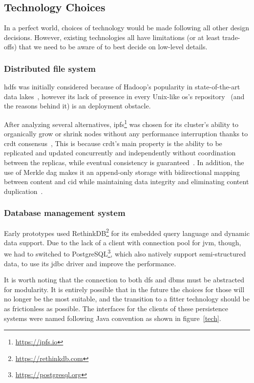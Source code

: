 \subsection{Technology Choices}
In a perfect world, choices of technology would be made following
all other design decisions.  However, existing technologies all have
limitations (or at least trade-offs) that we need to be aware of to best
decide on low-level details.

\subsubsection{Distributed file system}
\gls{hdfs} was initially considered because of Hadoop's popularity
in state-of-the-art data lakes~\cite{lake}, however its lack of presence
in every Unix-like \gls{os}'s repository~\cite{hdfs} (and the reasons behind it)
is an deployment obstacle.

After analyzing several alternatives, \gls{ipfs}\footnote{\url{https://ipfs.io}}
was chosen for its cluster's ability to organically grow or shrink nodes
without any performance interruption thanks to \gls{crdt} consensus~\cite{pin},
This is because \gls{crdt}'s main property is the ability to be replicated
and updated concurrently and independently without coordination between
the replicas, while eventual consistency is guaranteed~\cite{crdt}.
In addition, the use of Merkle \gls{dag} makes it an append-only storage
with bidirectional mapping between content and \gls{cid} while maintaining
data integrity and eliminating content duplication~\cite{ipfs}.

\subsubsection{Database management system}
Early prototypes used RethinkDB\footnote{\url{https://rethinkdb.com}}
for its embedded query language and dynamic data support.  Due to the lack
of a client with connection pool for \gls{jvm}, though, we had to switched to
PostgreSQL\footnote{\url{https://postgresql.org}}, which also natively support
semi-structured data, to use its \gls{jdbc} driver and improve the performance.

It is worth noting that the connection to both \gls{dfs} and \gls{dbms}
must be abstracted for modularity.  It is entirely possible that in the future
the choices for those will no longer be the most suitable, and the transition
to a fitter technology should be as frictionless as possible.  The interfaces
for the clients of these persistence systems were named following
Java convention as shown in figure~\ref{tech}.

